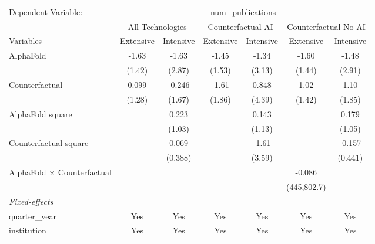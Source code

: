 \begingroup
\centering
\begin{tabular}{lcccccc}
   \tabularnewline \midrule \midrule
   Dependent Variable: & \multicolumn{6}{c}{num\_publications}\\
 & \multicolumn{2}{c}{All Technologies} & \multicolumn{2}{c}{Counterfactual AI} & \multicolumn{2}{c}{Counterfactual No AI} \\
\cmidrule(lr){1-1}\cmidrule(lr){2-3} \cmidrule(lr){4-5} \cmidrule(lr){6-7}
Variables & \multicolumn{1}{c}{Extensive} & \multicolumn{1}{c}{Intensive} & \multicolumn{1}{c}{Extensive} & \multicolumn{1}{c}{Intensive} & \multicolumn{1}{c}{Extensive} & \multicolumn{1}{c}{Intensive} \\
\cmidrule(lr){1-1}\cmidrule(lr){2-2} \cmidrule(lr){3-3} \cmidrule(lr){4-4} \cmidrule(lr){5-5} \cmidrule(lr){6-6} \cmidrule(lr){7-7}
   AlphaFold                          & -1.63  & -1.63   & -1.45  & -1.34  & -1.60       & -1.48\\   
                                      & (1.42) & (2.87)  & (1.53) & (3.13) & (1.44)      & (2.91)\\   
   Counterfactual                     & 0.099  & -0.246  & -1.61  & 0.848  & 1.02        & 1.10\\   
                                      & (1.28) & (1.67)  & (1.86) & (4.39) & (1.42)      & (1.85)\\   
   AlphaFold square                   &        & 0.223   &        & 0.143  &             & 0.179\\   
                                      &        & (1.03)  &        & (1.13) &             & (1.05)\\   
   Counterfactual square              &        & 0.069   &        & -1.61  &             & -0.157\\   
                                      &        & (0.388) &        & (3.59) &             & (0.441)\\   
   AlphaFold $\times$ Counterfactual  &        &         &        &        & -0.086      &   \\   
                                      &        &         &        &        & (445,802.7) &   \\   
   \midrule
   \emph{Fixed-effects}\\
   quarter\_year                      & Yes    & Yes     & Yes    & Yes    & Yes         & Yes\\  
   institution                        & Yes    & Yes     & Yes    & Yes    & Yes         & Yes\\  

\end{tabular}
